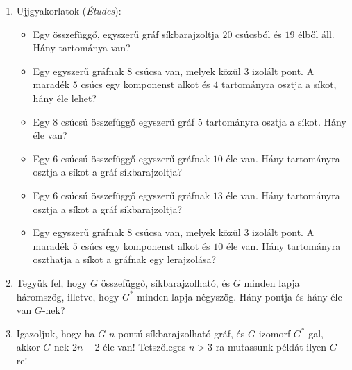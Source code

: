 \documentclass[a4paper,12pt]{article}
\begin{document}
\begin{enumerate}
            \item Ujjgyakorlatok (\textit{Études}):
            \begin{itemize}
                \item Egy összefüggő, egyszerű gráf síkbarajzoltja $20$ csúcsból és $19$ élből áll. Hány tartománya van?
                \item Egy egyszerű gráfnak $8$ csúcsa van, melyek közül $3$ izolált pont. A maradék $5$ csúcs egy komponenst alkot és $4$ tartományra osztja a síkot, hány éle lehet?
                \item Egy $8$ csúcsú összefüggő egyszerű gráf $5$ tartományra osztja a síkot. Hány éle van?
                \item Egy $6$ csúcsú összefüggő egyszerű gráfnak $10$ éle van. Hány tartományra osztja a síkot a gráf síkbarajzoltja?
                \item Egy $6$ csúcsú összefüggő egyszerű gráfnak $13$ éle van. Hány tartományra osztja a síkot a gráf síkbarajzoltja?
                \item Egy egyszerű gráfnak $8$ csúcsa van, melyek közül $3$ izolált pont. A maradék $5$ csúcs egy komponenst alkot és $10$ éle van. Hány tartományra oszthatja a síkot a gráfnak egy lerajzolása?
            \end{itemize}

            \item Tegyük fel, hogy $G$ összefüggő, síkbarajzolható, és $G$ minden lapja háromszög, illetve, hogy $G^*$ minden lapja négyszög. Hány pontja és hány éle van $G$-nek?
            \item Igazoljuk, hogy ha $G$ $n$ pontú síkbarajzolható gráf, és $G$ izomorf $G^*$-gal, akkor $G$-nek $2n-2$ éle van! Tetszőleges $n>3$-ra mutassunk példát ilyen $G$-re!


\end{enumerate}
\end{document}
